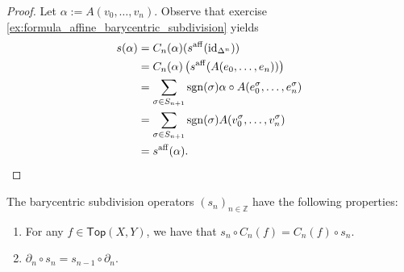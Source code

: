 \begin{proof}
	Let $\alpha := A(v_0,\dots,v_n)$. Observe that exercise \ref{ex:formula_affine_barycentric_subdivision} yields
	\begin{align*}
		s(\alpha) &= C_n(\alpha)(s^{\mathrm{aff}}(\id_{\Delta^n}))\\
		&= C_n(\alpha)\del[1]{s^{\mathrm{aff}}(A(e_0,\dots,e_n))}\\
		&= \sum_{\sigma \in S_{n + 1}} \sgn(\sigma) \alpha \circ A(e_0^\sigma,\dots,e_n^\sigma)\\
		&= \sum_{\sigma \in S_{n + 1}} \sgn(\sigma) A(v_0^\sigma,\dots,v_n^\sigma)\\
		&= s^{\mathrm{aff}}(\alpha).
	\end{align*}	
\end{proof}

\begin{proposition}
	The barycentric subdivision operators $(s_n)_{n \in \mathbb{Z}}$ have the following properties:
	\begin{enumerate}[label = \textup{(}\alph*\textup{)},wide = 0pt]
		\item For any $f \in \mathsf{Top}(X,Y)$, we have that $s_n \circ C_n(f) = C_n(f) \circ s_n$.
		\item $\partial_n \circ s_n = s_{n - 1} \circ \partial_n$.
	\end{enumerate}
\end{proposition}

